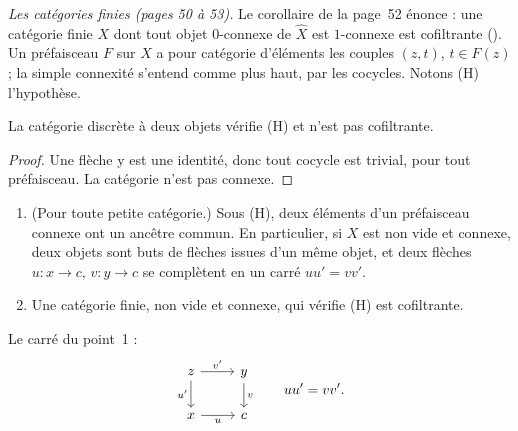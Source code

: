 \noindent\emph{Les catégories finies (pages 50 à 53).} Le corollaire de la page~52 énonce : une catégorie finie $X$ dont tout objet $0$-connexe de $\widehat X$ est $1$-connexe est cofiltrante (). Un préfaisceau $F$ sur $X$ a pour catégorie d'éléments les couples $(z, t)$, $t \in F(z)$ ; la simple connexité s'entend comme plus haut, par les cocycles. Notons (H) l'hypothèse.

\begin{encadre}
\begin{contrexemple}
La catégorie discrète à deux objets vérifie (H) et n'est pas cofiltrante.
\end{contrexemple}
\end{encadre}

\begin{proof}
Une flèche y est une identité, donc tout cocycle est trivial, pour tout préfaisceau. La catégorie n'est pas connexe.
\end{proof}

\begin{encadre}
\begin{theoreme}\leavevmode
\begin{enumerate}
\item (Pour toute petite catégorie.) Sous (H), deux éléments d'un préfaisceau connexe ont un ancêtre commun. En particulier, si $X$ est non vide et connexe, deux objets sont buts de flèches issues d'un même objet, et deux flèches $u : x \to c$, $v : y \to c$ se complètent en un carré $u u' = v v'$.
\item Une catégorie finie, non vide et connexe, qui vérifie (H) est cofiltrante.
\end{enumerate}
\end{theoreme}
\end{encadre}

Le carré du point~1 :
\[
\begin{tikzcd}
z \arrow[r, "v'"] \arrow[d, "u'"'] & y \arrow[d, "v"] \\
x \arrow[r, "u"'] & c
\end{tikzcd}
\qquad u u' = v v'.
\]

